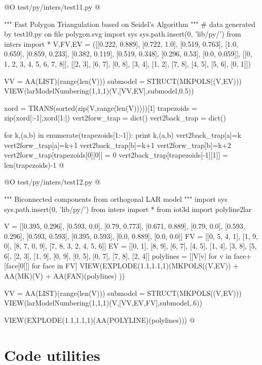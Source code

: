 \documentclass[11pt,oneside]{article}    %
\begin{document}
@O test/py/inters/test11.py
@{""" Fast Polygon Triangulation based on Seidel's Algorithm """
# data generated by test10.py on file polygon.svg
import sys
sys.path.insert(0, 'lib/py/')
from inters import *
V,FV,EV = ([[0.222, 0.889],
  [0.722, 1.0],
  [0.519, 0.763],
  [1.0, 0.659],
  [0.859, 0.233],
  [0.382, 0.119],
  [0.519, 0.348],
  [0.296, 0.53],
  [0.0, 0.059]],
 [[0, 1, 2, 3, 4, 5, 6, 7, 8]],
 [[2, 3], [6, 7], [0, 8], [3, 4], [1, 2], [7, 8], [4, 5], [5, 6], [0, 1]])
 
VV = AA(LIST)(range(len(V)))
submodel = STRUCT(MKPOLS((V,EV)))
VIEW(larModelNumbering(1,1,1)(V,[VV,EV],submodel,0.5))

 
xord = TRANS(sorted(zip(V,range(len(V)))))[1]
trapezoids = zip(xord[:-1],xord[1:])
vert2forw_trap = dict()
vert2back_trap = dict()

for k,(a,b) in enumerate(trapezoids[1:-1]):
	print k,(a,b)
	vert2back_trap[a]=k
	vert2forw_trap[a]=k+1
	vert2back_trap[b]=k+1
	vert2forw_trap[b]=k+2
vert2forw_trap[trapezoids[0][0]] = 0
vert2back_trap[trapezoids[-1][1]] = len(trapezoids)-1
@}


@O test/py/inters/test12.py
@{""" Biconnected components from orthogonal LAR model """
import sys
sys.path.insert(0, 'lib/py/')
from inters import *
from iot3d import polyline2lar

V = [[0.395, 0.296], [0.593, 0.0], [0.79, 0.773], [0.671, 0.889], [0.79, 0.0], [0.593, 0.296], [0.593, 0.593], [0.395, 0.593], [0.0, 0.889], [0.0, 0.0]]
FV = [[0, 5, 4, 1], [1, 9, 0], [8, 7, 0, 9], [7, 8, 3, 2, 4, 5, 6]]
EV = [[0, 1], [8, 9], [6, 7], [4, 5], [1, 4], [3, 8], [5, 6], [2, 3], [1, 9], [0, 9], [0, 5], [0, 7], [7, 8], [2, 4]]
polylines = [[V[v] for v in face+[face[0]]] for face in FV]
VIEW(EXPLODE(1.1,1.1,1)(MKPOLS((V,EV)) + AA(MK)(V) + AA(FAN)(polylines) ))

VV = AA(LIST)(range(len(V)))
submodel = STRUCT(MKPOLS((V,EV)))
VIEW(larModelNumbering(1,1,1)(V,[VV,EV,FV],submodel,.6))

VIEW(EXPLODE(1.1,1.1,1)(AA(POLYLINE)(polylines)))
@}

\appendix
\section{Code utilities}
\end{document}
